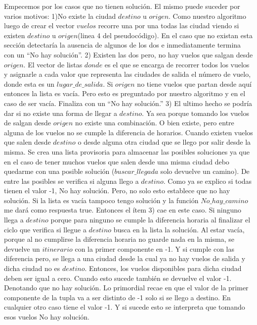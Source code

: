 \documentclass[a4paper]{article}
\begin{document}
Empecemos por los casos que no tienen solución. El mismo puede suceder por varios motivos:
1)No existe la ciudad $destino$ u $origen$. Como nuestro algoritmo luego de crear el vector $vuelos$ recorre una por una todas las ciudad viendo si existen $destino$ u $origen$(linea 4 del pseudocódigo). En el caso que no existan esta sección detectaría la ausencia de algunos de los dos e inmediatamente termina con un “No hay solución”.
2) Existen las dos pero, no hay vuelos que salgan desde $origen$. El vector de listas $donde$ es el que se encarga de recorrer todos los vuelos y asignarle a cada valor que representa las ciudades de salida el número de vuelo, donde esta es un $lugar\_de\_salida$. Si $origen$ no tiene vuelos que partan desde aquí entonces la lista es vacía. Pero esto es preguntado por nuestro algoritmo y en el caso de ser vacía. Finaliza con un “No hay solución.”
3) El ultimo hecho se podría dar si no existe una forma de llegar a $destino$. Ya sea porque tomando los vuelos de salgan desde $origen$ no existe una combinación. O bien existe, pero entre alguna de los vuelos no se cumple la diferencia de horarios. Cuando existen vuelos que salen desde $destino$ o desde alguna otra ciudad que se llego por salir desde la misma. Se crea una lista provisoria para almacenar las posibles soluciones ya que en el caso  de tener muchos vuelos que salen desde una misma ciudad debo quedarme con una posible solución ($buscar\_llegada$ solo devuelve un camino). De entre las posibles  se verifica si alguna llego a $destino$. Como ya se explico si todas tienen el valor -1, No hay solución. Pero, no solo esto establece que no hay solución. Si la lista es vacía tampoco tengo solución y la función $No\_hay\_camino$ me dará como respuesta true. Entonces el ítem 3) cae en este caso. Si ninguno llega a $destino$ porque para ninguno se cumple la diferencia horaria al finalizar el ciclo que verifica si llegue a $destino$  busca en la lista la solución. Al estar vacía, porque al no cumplirse la diferencia horaria no guarde nada en la misma, se devuelve un $itinerario$ con la primer componente en -1. Y si cumple con las diferencia pero, se llega a una ciudad desde la cual ya no hay vuelos de salida y dicha ciudad no es $destino$. Entonces, los vuelos disponibles para dicha ciudad deben ser igual a cero. Cuando esto sucede también se devuelve el valor -1. Denotando que no hay solución. Lo primordial recae en que el valor de la primer componente de la tupla va a ser distinto de -1 solo si se llego a destino. En cualquier  otro caso tiene el valor -1. Y si sucede esto se interpreta que tomando esos vuelos No hay solución.
\end{document}
